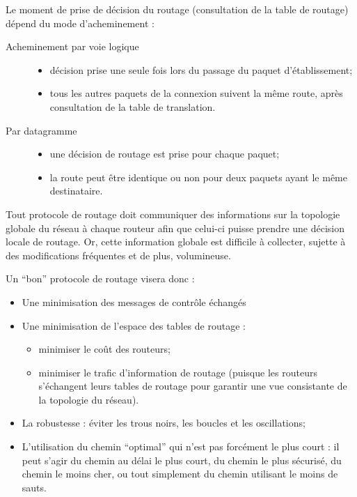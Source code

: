 \documentclass[11pt,english,french]{scrreprt}
\theoremstyle{remark}
\theoremstyle{definition}
\begin{document}
Le moment de prise de décision du routage (consultation de la table de routage) dépend du mode d'acheminement :\begin{description}
	\item[Acheminement par voie logique]\hfill\begin{itemize}
	 	\item décision prise une seule fois lors du passage du paquet d'établissement;
		\item tous les autres paquets de la connexion suivent la même route, après consultation de la table de translation.
	\end{itemize}
	\item[Par datagramme]\hfill\begin{itemize}
	 	\item une décision de routage est prise pour chaque paquet;
		\item la route peut être identique ou non pour deux paquets ayant le même destinataire.
	\end{itemize}
\end{description}

Tout protocole de routage doit communiquer des informations sur la topologie globale du réseau à chaque routeur afin que celui-ci puisse prendre une décision locale de routage. Or, cette information globale est difficile à collecter, sujette à des modifications fréquentes et de plus, volumineuse. 

Un ``bon'' protocole de routage visera donc :\begin{itemize}
	\item Une minimisation des messages de contrôle échangés
	\item Une minimisation de l'espace des tables de routage : \begin{itemize}
		\item minimiser le coût des routeurs;
		\item minimiser le trafic d'information de routage (puisque les routeurs s'échangent leurs tables de routage pour garantir une vue consistante de la topologie du réseau).
	\end{itemize}
	\item La robustesse : éviter les trous noirs, les boucles et les oscillations;
	\item L'utilisation du chemin ``optimal'' qui n'est pas forcément le plus court : il peut s'agir du chemin au délai le plus court, du chemin le plus sécurisé, du chemin le moins cher, ou tout simplement du chemin utilisant le moins de sauts.
\end{itemize}
\end{document}
